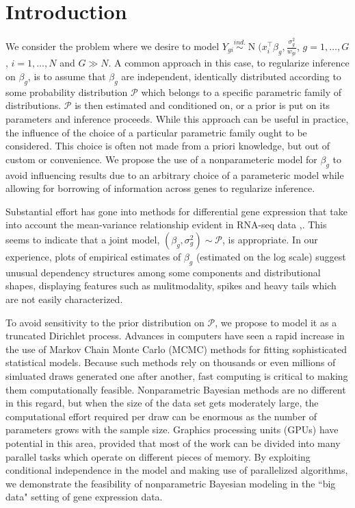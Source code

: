 \newcommand{\ind}{\stackrel{ind.}{\sim}}
\newcommand{\op}{\operatorname}
\newcommand{\code}{\texttt}

\section{Introduction}
We consider the problem where we desire to model $Y_{gi} \ind \op{N}(x_i^\top \beta_g, \frac{\sigma^2_g}{w_{gi}}$, $g=1,\ldots,G$, $i=1,\ldots,N$ and $G\gg N$. A common approach in this case, to regularize inference on $\beta_g$, is to assume that $\beta_g$ are independent, identically distributed according to some probability distribution $\mathcal{P}$ which belongs to a specific parametric family of distributions. $\mathcal{P}$ is then estimated and conditioned on, or a prior is put on its parameters and inference proceeds. While this approach can be useful in practice, the influence of the choice of a particular parametric family ought to be considered. This choice is often not made from a priori knowledge, but out of custom or convenience. We propose the use of a nonparameteric model for $\beta_g$ to avoid influencing results due to an arbitrary choice of a parameteric model while allowing for borrowing of information across genes to regularize inference.

Substantial effort has gone into methods for differential gene expression that take into account the mean-variance relationship evident in RNA-seq data \cite{edger2010}\cite{deseq2014},. This seems to indicate that a joint model, $(\beta_g, \sigma^2_g) \sim \mathcal{P}$, is appropriate. In our experience, plots of empirical estimates of $\beta_g$ (estimated on the log scale) suggest unusual dependency structures among some components and distributional shapes, displaying features such as mulitmodality, spikes and heavy tails which are not easily characterized. 

To avoid sensitivity to the prior distribution on $\mathcal{P}$, we propose to model it as a truncated Dirichlet process. Advances in computers have seen a rapid increase in the use of Markov Chain Monte Carlo (MCMC) methods for fitting sophisticated statistical models. Because such methods rely on thousands or even millions of simluated draws generated one after another, fast computing is critical to making them computationally feasible. Nonparametric Bayesian methods are no different in this regard, but when the size of the data set gets moderately large, the computational effort required per draw can be enormous as the number of parameters grows with the sample size. Graphics processing units (GPUs) have potential in this area, provided that most of the work can be divided into many parallel tasks which operate on different pieces of memory. By exploiting conditional independence in the model and making use of parallelized algorithms, we demonstrate the feasibility of nonparametric Bayesian modeling in the ``big data" setting of gene expression data.


